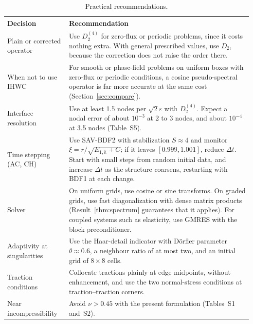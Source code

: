 \documentclass[preprint,12pt]{elsarticle}
\theoremstyle{remark}
\begin{document}
\begin{table}[t]\centering\small
\caption{Practical recommendations.}\label{tab:guide}
\begin{tabular}{p{3.3cm}p{10.6cm}}
\toprule
Decision & Recommendation\\
\midrule
Plain or corrected operator & Use $D_2^{(4)}$ for zero-flux or periodic problems, since it costs nothing extra. With general prescribed values, use $D_2$, because the correction does not raise the order there.\\
When not to use IHWC & For smooth or phase-field problems on uniform boxes with zero-flux or periodic conditions, a cosine pseudo-spectral operator is far more accurate at the same cost (Section~\ref{sec:compare}).\\
Interface resolution & Use at least 1.5 nodes per $\sqrt2\varepsilon$ with $D_2^{(4)}$. Expect a nodal error of about $10^{-3}$ at 2 to 3 nodes, and about $10^{-4}$ at 3.5 nodes (Table~S5).\\
Time stepping (AC, CH) & Use SAV-BDF2 with stabilization $S\approx4$ and monitor $\xi=r/\sqrt{E_{1,h}+C}$; if it leaves $[0.999,1.001]$, reduce $\Delta t$. Start with small steps from random initial data, and increase $\Delta t$ as the structure coarsens, restarting with BDF1 at each change.\\
Solver & On uniform grids, use cosine or sine transforms. On graded grids, use fast diagonalization with dense matrix products (Result~\ref{thm:spectrum} guarantees that it applies). For coupled systems such as elasticity, use GMRES with the block preconditioner.\\
Adaptivity at singularities & Use the Haar-detail indicator with D\"orfler parameter $\theta\approx0.6$, a neighbour ratio of at most two, and an initial grid of $8\times8$ cells.\\
Traction conditions & Collocate tractions plainly at edge midpoints, without enhancement, and use the two normal-stress conditions at traction--traction corners.\\
Near incompressibility & Avoid $\nu>0.45$ with the present formulation (Tables~S1 and~S2).\\
\bottomrule
\end{tabular}
\end{table}

\end{document}
